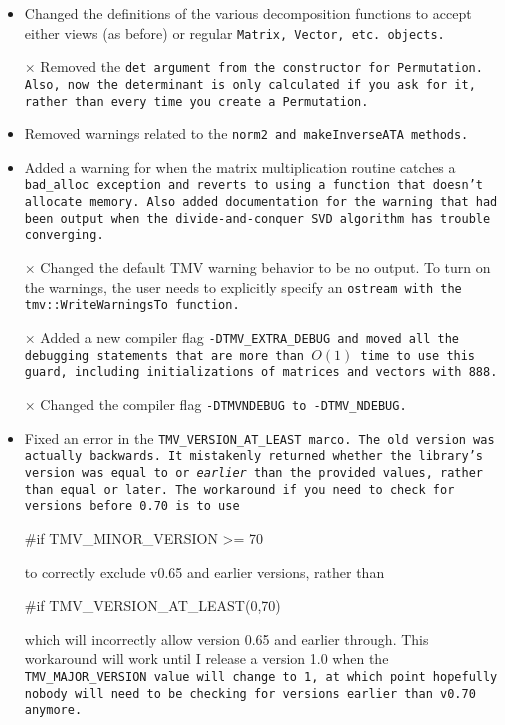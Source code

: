 \begin{description}
\begin{itemize}
\item
Changed the definitions of the various decomposition functions
to accept either views (as before) or regular \tt{Matrix}, \tt{Vector},
etc. objects.  

\item[$\times$]
Removed the \tt{det} argument from the constructor for \tt{Permutation}.
Also, now the determinant is only calculated if you ask for it, rather 
than every time you create a \tt{Permutation}.

\item
Removed warnings related to the \tt{norm2} and \tt{makeInverseATA} methods.

\item 
Added a warning for when the matrix multiplication routine catches a \tt{bad\_alloc} exception and reverts to using a function that doesn't allocate memory.  Also added documentation for the warning that had been output when the divide-and-conquer SVD algorithm has trouble converging.

\item[$\times$]
Changed the default TMV warning behavior to be no output.  To turn on the warnings, the user needs to explicitly specify an \tt{ostream} with the \tt{tmv::WriteWarningsTo} function.

\item[$\times$]
Added a new compiler flag \tt{-DTMV\_EXTRA\_DEBUG} and moved all the debugging statements that are more than $O(1)$ time to use this guard, including initializations of matrices and vectors with \tt{888}.

\item[$\times$]
Changed the compiler flag \tt{-DTMVNDEBUG} to \tt{-DTMV\_NDEBUG}.

\item
Fixed an error in the \tt{TMV\_VERSION\_AT\_LEAST} marco.  The old version was actually backwards.  It mistakenly returned whether the library's version was equal to or {\em earlier} than the provided values, rather than equal or later.  The workaround if you need to check for versions before 0.70 is to use 
\begin{tmvcode}
#if TMV_MINOR_VERSION >= 70 
\end{tmvcode}
to correctly exclude v0.65 and earlier versions, rather than
\begin{tmvcode}
#if TMV_VERSION_AT_LEAST(0,70)
\end{tmvcode}
which will incorrectly allow version 0.65 and earlier through.  This workaround will work until I release a version 1.0 when the \tt{TMV\_MAJOR\_VERSION} value will change to 1, at which point hopefully nobody will need to be checking for versions earlier than v0.70 anymore.


\end{itemize}
\end{description}
